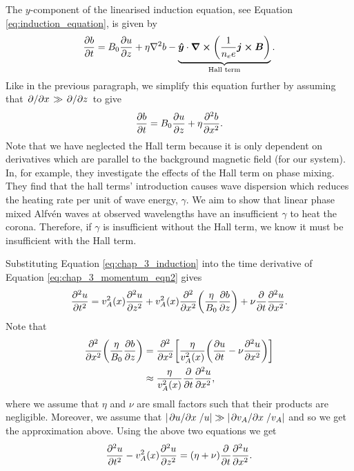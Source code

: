 The $y$-component of the linearised induction equation, see Equation \eqref{eq:induction_equation}, is given by
\begin{equation}
    \pdv{b}{t} = B_0\pdv{u}{z}+\eta\nabla^2 b - \underbrace{\boldsymbol{\hat{y}}\cdot\curl(\frac{1}{n_e e}\boldsymbol{j}\cross\boldsymbol{B})}_{\text{Hall term}}.
\end{equation}
Like in the previous paragraph, we simplify this equation further by assuming that $\pdv*{}{x}\gg\pdv*{}{z}$ to give 
\begin{equation}
    \label{eq:chap_3_induction}
    \pdv{b}{t} = B_0\pdv{u}{z}+\eta\pdv[2]{b}{x}.
\end{equation}
Note that we have neglected the Hall term because it is only dependent on derivatives which are parallel to the background magnetic field (for our system). In, for example, \citet{Threlfall2017} they investigate the effects of the Hall term on phase mixing. They find that the hall terms' introduction causes wave dispersion which reduces the heating rate per unit of wave energy, $\gamma$. We aim to show that linear phase mixed Alfv\'en waves at observed wavelengths have an insufficient $\gamma$ to heat the corona. Therefore, if $\gamma$ is insufficient without the Hall term, we know it must be insufficient with the Hall term.

Substituting Equation \eqref{eq:chap_3_induction} into the time derivative of Equation \eqref{eq:chap_3_momentum_eqn2} gives
\[\pdv[2]{u}{t}=v_A^2(x)\pdv[2]{u}{z}+v_A^2(x)\pdv[2]{}{x}\qty(\frac{\eta}{B_0}\pdv{b}{z})+\nu\pdv{}{t}\pdv[2]{u}{x}.\]
Note that
\[\begin{aligned}
\pdv[2]{}{x}\qty(\frac{\eta}{B_0}\pdv{b}{z}) &= \pdv[2]{}{x}\qty[\frac{\eta}{v_A^2(x)}\qty(\pdv{u}{t} - \nu \pdv[2]{u}{x})] \\
&\approx \frac{\eta}{v_A^2(x)}\pdv{}{t}\pdv[2]{u}{x},
\end{aligned}\]
where we assume that $\eta$ and $\nu$ are small factors such that their products are negligible. Moreover, we assume that $\abs{\pdv*{u}{x}/u}\gg\abs{\pdv*{v_A}{x}/v_A}$ and so we get the approximation above. Using the above two equations we get
\begin{equation}
    \label{eq:wave_diffusion_equation}
    \pdv[2]{u}{t}-v_A^2(x)\pdv[2]{u}{z}= (\eta+\nu)\pdv{}{t}\pdv[2]{u}{x}.
\end{equation}

